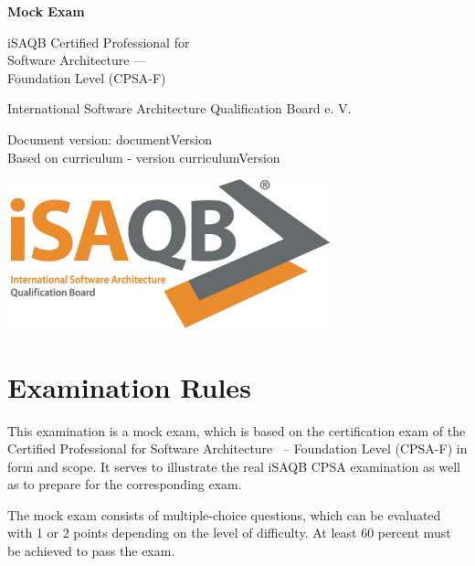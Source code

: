 \documentclass[12pt,a4paper]{article}
\begin{document}
\pagestyle{fancy}

\begin{titlepage}
  \begin{center}
   {\huge\bfseries Mock Exam

     iSAQB\registered{} Certified Professional for\\ Software Architecture ---\\[2ex]
     
     Foundation Level (CPSA-F\registered{})}

  \bigskip
  
  {\large International Software Architecture Qualification Board
    e. V.}

  \bigskip

  Document version: {{documentVersion}}\\
  Based on curriculum - version {{curriculumVersion}}
\end{center}

\vspace*{\fill}

\begin{center}
\includegraphics[width=0.7\textwidth]{isaqb-logo}
\end{center}

\end{titlepage}

\section*{Examination Rules}

This examination is a mock exam, which is based on the certification
exam of the Certified Professional for Software Architecture ~--
Foundation Level (CPSA-F\registered{}) in form and scope. It serves to illustrate
the real iSAQB\registered{} CPSA\registered{} examination as well as to prepare for the
corresponding exam.

The mock exam consists of \examQuestionCount{} multiple-choice
questions, which can be evaluated with 1 or 2 points depending on the
level of difficulty. At least 60 percent must be achieved to pass the
exam.
\end{document}
